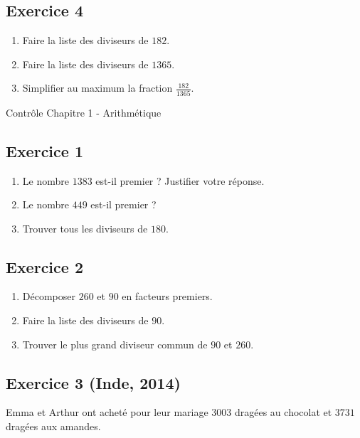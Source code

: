 \documentclass[14 pt]{extarticle}
\theoremstyle{plain}
\begin{document}
 \subsection*{Exercice 4}
 
 \begin{enumerate}
 \item Faire la liste des diviseurs de $182$. 
 \item Faire la liste des diviseurs de $1365$.
 \item Simplifier au maximum la fraction $\frac{182}{1365}$. 
 \end{enumerate}
 \newpage
 
\begin{center}{\Large Contrôle Chapitre 1 - Arithmétique}\\ 
 \end{center} 
 \subsection*{Exercice 1} 
 
 \begin{enumerate}
 \item Le nombre $1383$ est-il premier ? Justifier votre réponse. 
 \item Le nombre $449$ est-il premier ? 
 \item Trouver tous les diviseurs de $180$. 
 \end{enumerate}
 
\subsection*{Exercice 2} 
\begin{enumerate}
\item Décomposer $260$ et $90$ en facteurs premiers. 
\item Faire la liste des diviseurs de $90$. 
\item Trouver le plus grand diviseur commun de $90$ et $260$.
\end{enumerate} 

 
 \subsection*{Exercice 3 (Inde, 2014)}
 
 Emma et Arthur ont acheté pour leur mariage
 $3 003$ dragées au chocolat et 
 $3 731$ dragées aux amandes. 
 
\end{document}
